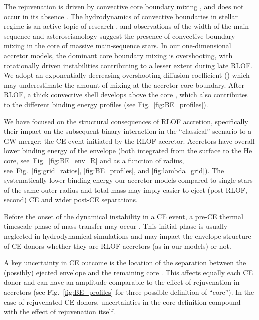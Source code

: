 \documentclass[twocolumn,twocolappendix,trackchanges]{aastex63}
\DeclareRobustCommand{\Figref}[1]{Fig.~\ref{#1}}
\begin{document}
The rejuvenation is driven by convective core boundary mixing
\citep[e.g.,][]{hellings:1983, hellings:1984, cantiello:2007,
  renzo:2021zoph}, and does not occur in its absence \citep{braun:95}.
The hydrodynamics of convective boundaries in stellar regime is an
active topic of research \citep[e.g.,][]{anders:22a, anders:22b}, and
observations of the width of the main sequence
\citep[e.g.,][]{brott:11} and asteroseismology
\citep[e.g.,][]{moravveji:16} suggest the presence of convective
boundary mixing in the core of massive main-sequence stars. In our
one-dimensional accretor models, the dominant core boundary mixing is
overshooting, with rotationally driven instabilities contributing to a
lesser extent during late RLOF. We adopt an exponentially decreasing
overshooting diffusion coefficient (\citealt{claret:17}) which may
underestimate the amount of mixing at the accretor core boundary.
After RLOF, a thick convective shell develops above the core
\citep[see][]{renzo:2021zoph}, which also contributes to the different
binding energy profiles (see \Figref{fig:BE_profiles}).

We have focused on the structural consequences of RLOF accretion,
specifically their impact on the subsequent binary interaction in the
``classical'' scenario to a GW merger: the CE event initiated by the
RLOF-accretor. Accretors have overall lower binding energy of the envelope
(both integrated from the surface to the He core,
see~\Figref{fig:BE_env_R} and as a function of radius,
see~\Figref{fig:grid_ratios}, \ref{fig:BE_profiles}, and \ref{fig:lambda_grid}). The
systematically lower binding energy our accretor models compared to
single stars of the same outer radius and total mass may
imply easier to eject (post-RLOF, second) CE and wider post-CE separations.

Before the onset of the dynamical instability in a CE event, a pre-CE
thermal timescale phase of mass transfer may occur
\citep[e.g.,][]{hjellming:1987, pejcha:17, blagorodnova:2021}. This
initial phase is usually neglected in hydrodynamical simulations and
may impact the envelope structure of CE-donors whether they are
RLOF-accretors (as in our models) or not.

A key uncertainty in CE outcome is the location of the separation
between the (possibly) ejected envelope and the remaining core
\citep[e.g.,][]{tauris:01}. This affects equally each CE donor and
can have an amplitude comparable to the effect of rejuvenation in
accretors (see \Figref{fig:BE_profiles} for three possible definition
of ``core''). In the case of rejuvenated CE donors, uncertainties in the
core definition compound with the effect of rejuvenation itself.
\end{document}
